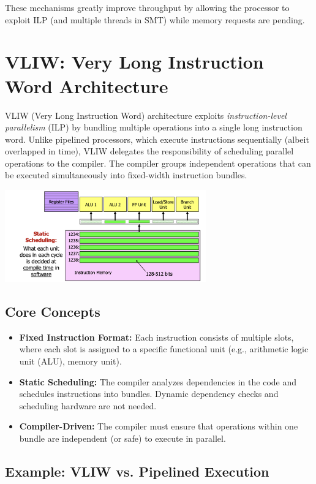These mechanisms greatly improve throughput by allowing the processor to exploit ILP (and multiple threads in SMT) while memory requests are pending.

\newpage
\section{VLIW: Very Long Instruction Word Architecture}

VLIW (Very Long Instruction Word) architecture exploits \emph{instruction-level parallelism} (ILP) by bundling multiple operations into a single long instruction word. Unlike pipelined processors, which execute instructions sequentially (albeit overlapped in time), VLIW delegates the responsibility of scheduling parallel operations to the compiler. The compiler groups independent operations that can be executed simultaneously into fixed-width instruction bundles.
\begin{center}
    \includegraphics[width=0.65\textwidth]{chapters/chapter4f/images/VLIW.png}
\end{center}
\subsection{Core Concepts}
\begin{itemize}
    \item \textbf{Fixed Instruction Format:} Each instruction consists of multiple slots, where each slot is assigned to a specific functional unit (e.g., arithmetic logic unit (ALU), memory unit).
    \item \textbf{Static Scheduling:} The compiler analyzes dependencies in the code and schedules instructions into bundles. Dynamic dependency checks and scheduling hardware are not needed.
    \item \textbf{Compiler-Driven:} The compiler must ensure that operations within one bundle are independent (or safe) to execute in parallel.
\end{itemize}

\subsection{Example: VLIW vs. Pipelined Execution}

